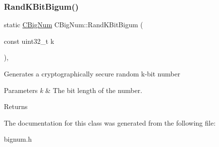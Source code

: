 \subsubsection{\texorpdfstring{RandKBitBigum()}{RandKBitBigum()}}
{\footnotesize\ttfamily static \mbox{\hyperlink{class_c_big_num}{C\+Big\+Num}} C\+Big\+Num\+::\+Rand\+K\+Bit\+Bigum (\begin{DoxyParamCaption}\item[{const uint32\+\_\+t}]{k }\end{DoxyParamCaption})\hspace{0.3cm}{\ttfamily [inline]}, {\ttfamily [static]}}

Generates a cryptographically secure random k-\/bit number 
\begin{DoxyParams}{Parameters}
{\em k} & The bit length of the number. \\
\hline
\end{DoxyParams}
\begin{DoxyReturn}{Returns}

\end{DoxyReturn}


The documentation for this class was generated from the following file\+:\begin{DoxyCompactItemize}
\item 
bignum.\+h\end{DoxyCompactItemize}
